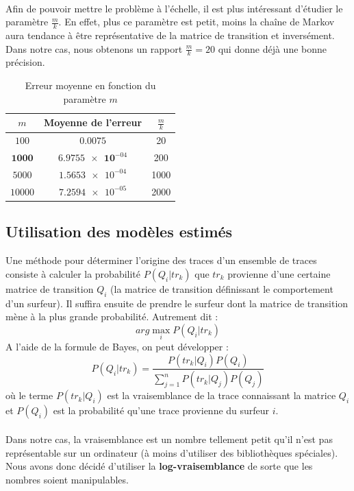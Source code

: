 \documentclass[a4paper,titlepage]{report}
\begin{document}
\paragraph{} 
Afin de pouvoir mettre le problème à l'échelle, il est plus intéressant d'étudier le paramètre $\frac{m}{k}$. En effet, plus ce paramètre est petit, moins la chaîne de Markov aura tendance à être représentative de la matrice de transition et inversément. Dans notre cas, nous obtenons un rapport $\frac{m}{k} = 20$ qui donne déjà une bonne précision.
\begin{table}[ht]
	\center
	\begin{tabular}{|c||c|c|}
		\hline
		$m$ & \textbf{Moyenne de l'erreur} & $\frac{m}{k}$\\
		\hline
		$100$ & $0.0075$ & 20\\
		$\mathbf{1000}$ & $\mathbf{\num{6.9755e-04}}$ & 200\\
		$5000$ & $\num{1.5653e-04}$ & 1000\\
		$10000$ & $\num{7.2594e-05}$ & 2000\\
		\hline
	\end{tabular}
	\caption{Erreur moyenne en fonction du paramètre $m$}
	\label{tab:eqm_m}
\end{table}
\subsection{Utilisation des modèles estimés}
\label{ssec:util_esti}
Une méthode pour déterminer l'origine des traces d'un ensemble de traces consiste à calculer la probabilité $P(Q_i|tr_k)$ que $tr_k$ provienne d'une certaine matrice de transition $Q_i$ (la matrice de transition définissant le comportement d'un surfeur). Il suffira ensuite de prendre le surfeur dont la matrice de transition mène à la plus grande probabilité. Autrement dit : 
\[
arg \max\limits_i P(Q_i|tr_k)
\]
A l'aide de la formule de Bayes, on peut développer : 
\[
P(Q_i|tr_k) = \dfrac{P(tr_k|Q_i) P(Q_i)}{\sum\limits_{j = 1}^n P(tr_k|Q_j) P(Q_j)}
\]
où le terme $P(tr_k|Q_i)$ est la vraisemblance de la trace connaissant la matrice $Q_i$ et $P(Q_i)$ est la probabilité qu'une trace provienne du surfeur $i$.
\paragraph{}
Dans notre cas, la vraisemblance est un nombre tellement petit qu'il n'est pas représentable sur un ordinateur (à moins d'utiliser des bibliothèques spéciales). Nous avons donc décidé d'utiliser la \textbf{log-vraisemblance} de sorte que les nombres soient manipulables. 
\end{document}
